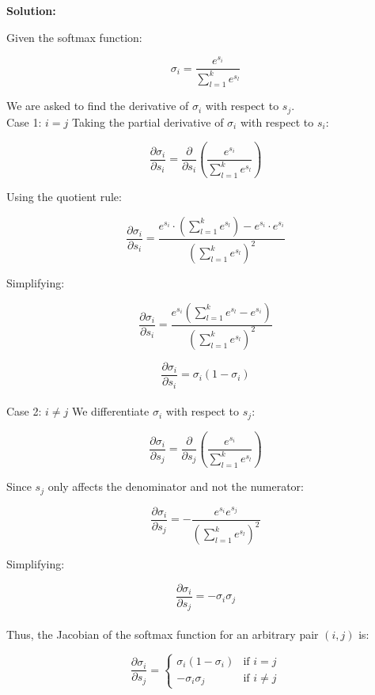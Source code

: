 \documentclass{article}
\newenvironment{solution}{\color{blue} \smallskip \textbf{Solution:}}{}
\begin{document}
\begin{solution}
    
    
Given the softmax function:

\[
\sigma_i = \frac{e^{s_i}}{\sum_{l=1}^{k} e^{s_l}}
\]

We are asked to find the derivative of $\sigma_i$ with respect to $s_j$.\\

Case 1: $i = j$
Taking the partial derivative of $\sigma_i$ with respect to $s_i$:

\[
\frac{\partial \sigma_i}{\partial s_i} = \frac{\partial}{\partial s_i} \left( \frac{e^{s_i}}{\sum_{l=1}^{k} e^{s_l}} \right)
\]

Using the quotient rule:

\[
\frac{\partial \sigma_i}{\partial s_i} = \frac{e^{s_i} \cdot \left( \sum_{l=1}^{k} e^{s_l} \right) - e^{s_i} \cdot e^{s_i}}{\left( \sum_{l=1}^{k} e^{s_l} \right)^2}
\]

Simplifying:

\[
\frac{\partial \sigma_i}{\partial s_i} = \frac{e^{s_i} \left( \sum_{l=1}^{k} e^{s_l} - e^{s_i} \right)}{\left( \sum_{l=1}^{k} e^{s_l} \right)^2}
\]

\[
\frac{\partial \sigma_i}{\partial s_i} = \sigma_i \left( 1 - \sigma_i \right)
\]\\

Case 2: $i \neq j$
We differentiate $\sigma_i$ with respect to $s_j$:

\[
\frac{\partial \sigma_i}{\partial s_j} = \frac{\partial}{\partial s_j} \left( \frac{e^{s_i}}{\sum_{l=1}^{k} e^{s_l}} \right)
\]

Since $s_j$ only affects the denominator and not the numerator:

\[
\frac{\partial \sigma_i}{\partial s_j} = - \frac{e^{s_i} e^{s_j}}{\left( \sum_{l=1}^{k} e^{s_l} \right)^2}
\]

Simplifying:

\[
\frac{\partial \sigma_i}{\partial s_j} = - \sigma_i \sigma_j
\]\\

Thus, the Jacobian of the softmax function for an arbitrary pair $(i, j)$ is:

\[
\frac{\partial \sigma_i}{\partial s_j} =
\begin{cases}
\sigma_i (1 - \sigma_i) & \text{if } i = j \\
-\sigma_i \sigma_j & \text{if } i \neq j
\end{cases}
\]
    
    
    
\end{solution}
\end{document}
